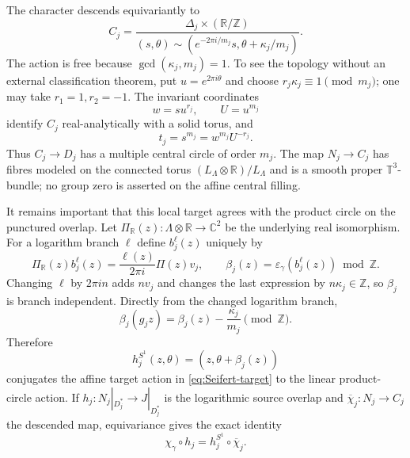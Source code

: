 \documentclass[11pt,letterpaper]{article}
\numberwithin{equation}{section}
\theoremstyle{definition}
\theoremstyle{remark}
\newcommand{\R}{\mathbb R}
\newcommand{\C}{\mathbb C}
\newcommand{\Z}{\mathbb Z}
\newcommand{\T}{\mathbb T}
\begin{document}
The character descends equivariantly to
\begin{equation}
 C_j=\frac{\Delta_j\times(\R/\Z)}
 {(s,\theta)\sim
  (e^{-2\pi i/m_j}s,\theta+\kappa_j/m_j)}.
 \label{eq:Seifert-target}
\end{equation}
The action is free because $\gcd(\kappa_j,m_j)=1$.  To see the topology
without an external classification theorem, put $u=e^{2\pi i\theta}$ and
choose $r_j\kappa_j\equiv1\pmod{m_j}$; one may take
$r_1=1,r_2=-1$.  The invariant coordinates
\begin{equation}
 w=su^{r_j},\qquad U=u^{m_j}
 \label{eq:solid-torus-chart}
\end{equation}
identify $C_j$ real-analytically with a solid torus, and
\begin{equation}
 t_j=s^{m_j}=w^{m_j}U^{-r_j}.
 \label{eq:Seifert-multiplicity}
\end{equation}
Thus $C_j\to D_j$ has a multiple central circle of order $m_j$.  The map
$N_j\to C_j$ has fibres modeled on the connected torus
$(L_\Lambda\otimes\R)/L_\Lambda$ and is a smooth proper $\T^3$-bundle;
no group zero is asserted on the affine central filling.

It remains important that this local target agrees with the product circle
on the punctured overlap.  Let
$\Pi_\R(z):\Lambda\otimes\R\to\C^2$ be the underlying real isomorphism.
For a logarithm branch $\ell$ define $b_j^\ell(z)$ uniquely by
\begin{equation}
 \Pi_\R(z)b_j^\ell(z)
 =\frac{\ell(z)}{2\pi i}\Pi(z)v_j,
 \qquad
 \beta_j(z)=\varepsilon_\gamma(b_j^\ell(z))\bmod\Z.
 \label{eq:beta-overlap}
\end{equation}
Changing $\ell$ by $2\pi i n$ adds $nv_j$ and changes the last expression
by $n\kappa_j\in\Z$, so $\beta_j$ is branch independent.  Directly from
the changed logarithm branch,
\begin{equation}
 \beta_j(g_jz)=\beta_j(z)-\frac{\kappa_j}{m_j}\pmod\Z.
 \label{eq:beta-cocycle}
\end{equation}
Therefore
\begin{equation}
 h_j^{S^1}(z,\theta)=(z,\theta+\beta_j(z))
 \label{eq:target-overlap}
\end{equation}
conjugates the affine target action in \cref{eq:Seifert-target} to the
linear product-circle action.  If
$h_j:N_j|_{D_j^*}\to J|_{D_j^*}$ is the logarithmic source overlap and
$\overline\chi_j:N_j\to C_j$ the descended map, equivariance gives the
exact identity
\begin{equation}
 \chi_\gamma\circ h_j=h_j^{S^1}\circ\overline\chi_j.
 \label{eq:overlap-identity}
\end{equation}
\end{document}
